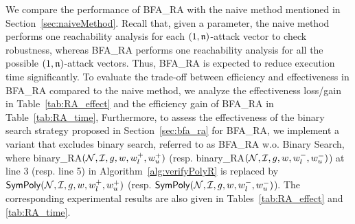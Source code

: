 \begin{table}[t]
    \centering
    \caption{The computation time (in GPU hours) of the three methods.}
    \label{tab:RA_time}%
\end{table}

We compare the performance of {\sf BFA\_RA} with the naive method mentioned in Section~\ref{sec:naiveMethod}. Recall that, given a parameter, the naive method performs one reachability analysis for each $(1,\mathfrak{n})$-attack vector
to check robustness, whereas {\sf BFA\_RA} performs one reachability analysis for all the possible $(1,\mathfrak{n})$-attack vectors. Thus, {\sf BFA\_RA} is expected to reduce execution time significantly. To evaluate the trade-off between efficiency and effectiveness in {\sf BFA\_RA} compared to the naive method, we analyze the effectiveness loss/gain in Table~\ref{tab:RA_effect} and the efficiency gain of {\sf BFA\_RA} in Table~\ref{tab:RA_time}, 
% 
Furthermore, to assess the effectiveness of the binary search strategy proposed in Section~\ref{sec:bfa_ra} for {\sf BFA\_RA}, we implement a variant that excludes binary search, referred to as {\sf BFA\_RA} w.o. Binary Search, where {\sf binary\_RA}$({\mathcal{N}},{\mathcal{I}}, g, w,w^+_l,w^+_u)$ (resp. {\sf binary\_RA}$({\mathcal{N}},{\mathcal{I}},g,w,w^-_l,w^-_u)$) at line 3 (resp. line 5) in Algorithm~\ref{alg:verifyPolyR} is replaced by ${\sf SymPoly}({\mathcal{N}},{\mathcal{I}},g,w,w^+_l,w^+_u)$ (resp. ${\sf SymPoly}({\mathcal{N}},{\mathcal{I}},g,w, w^-_l,w^-_u)$). The corresponding experimental results are also given in Tables~\ref{tab:RA_effect} and \ref{tab:RA_time}.


